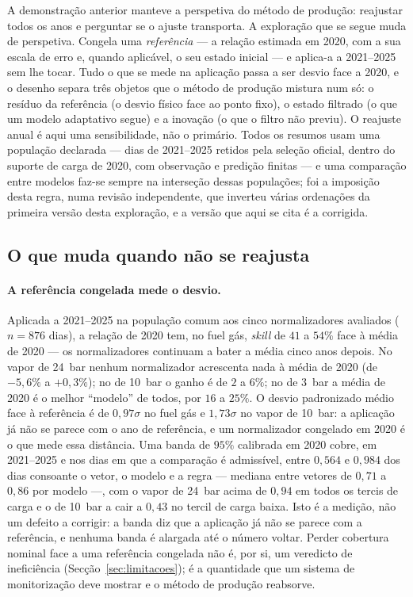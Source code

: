 A demonstração anterior manteve a perspetiva do método de produção:
reajustar todos os anos e perguntar se o ajuste transporta. A exploração
que se segue muda de perspetiva. Congela uma \emph{referência} --- a relação
estimada em 2020, com a sua escala de erro e, quando aplicável, o seu estado
inicial --- e aplica-a a 2021--2025 sem lhe tocar. Tudo o que se mede na
aplicação passa a ser desvio face a 2020, e o desenho separa três objetos
que o método de produção mistura num só: o resíduo da referência (o desvio
físico face ao ponto fixo), o estado filtrado (o que um modelo adaptativo
segue) e a inovação (o que o filtro não previu). O reajuste anual é aqui
uma sensibilidade, não o primário. Todos os resumos usam uma população
declarada --- dias de 2021--2025 retidos pela seleção oficial, dentro do
suporte de carga de 2020, com observação e predição finitas --- e uma
comparação entre modelos faz-se sempre na interseção dessas populações; foi
a imposição desta regra, numa revisão independente, que inverteu várias
ordenações da primeira versão desta exploração, e a versão que aqui se cita
é a corrigida.

\subsection{O que muda quando não se reajusta}
\label{sec:referencia-fixa}

\paragraph{A referência congelada mede o desvio.} Aplicada a 2021--2025 na
população comum aos cinco normalizadores avaliados ($n = 876$ dias), a
relação de 2020 tem, no fuel gás, \emph{skill} de $41$ a $54\%$ face à média
de 2020 --- os normalizadores continuam a bater a média cinco anos depois.
No vapor de 24~bar nenhum normalizador acrescenta nada à média de 2020 (de
$-5{,}6\%$ a $+0{,}3\%$); no de 10~bar o ganho é de $2$ a $6\%$; no de
3~bar a média de 2020 é o melhor ``modelo'' de todos, por $16$ a $25\%$. O
desvio padronizado médio face à referência é de $0{,}97\sigma$ no fuel gás
e $1{,}73\sigma$ no vapor de 10~bar: a aplicação já não se parece com o ano
de referência, e um normalizador congelado em 2020 é o que mede essa
distância. Uma banda de $95\%$ calibrada em 2020 cobre, em 2021--2025 e nos
dias em que a comparação é admissível, entre $0{,}564$ e $0{,}984$ dos dias
consoante o vetor, o modelo e a regra --- mediana entre vetores de
$0{,}71$ a $0{,}86$ por modelo ---, com o vapor de 24~bar acima de $0{,}94$
em todos os tercis de carga e o de 10~bar a cair a $0{,}43$ no tercil de
carga baixa. Isto é a medição, não um defeito a corrigir: a banda diz que a
aplicação já não se parece com a referência, e nenhuma banda é alargada até
o número voltar. Perder cobertura nominal face a uma referência congelada
não é, por si, um veredicto de ineficiência (Secção~\ref{sec:limitacoes});
é a quantidade que um sistema de monitorização deve mostrar e o método de
produção reabsorve.

